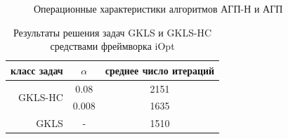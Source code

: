 \documentclass[a4paper,12pt,russian]{article}
\begin{document}
\begin{figure}[h!]
	\caption{Операционные характеристики алгоритмов АГП-Н и АГП}
	\label{oper_charact}
\end{figure}


\begin{table}[h!]
\centering
\caption{Результаты решения задач GKLS и GKLS-HC средствами фреймворка iOpt}
\begin{tabular}{||r|c|c||}
\hline
 класс задач & $\alpha$ & среднее число итераций \\ \hline
\multirow{2}{*}{GKLS-HC} & 0.08 & 2151 \\ \cline{2-3} 
 & 0.008 & 1635 \\ \hline
GKLS & - & 1510 \\ \hline
\end{tabular}
\label{iOpt_gkls}
\end{table}
\end{document}
